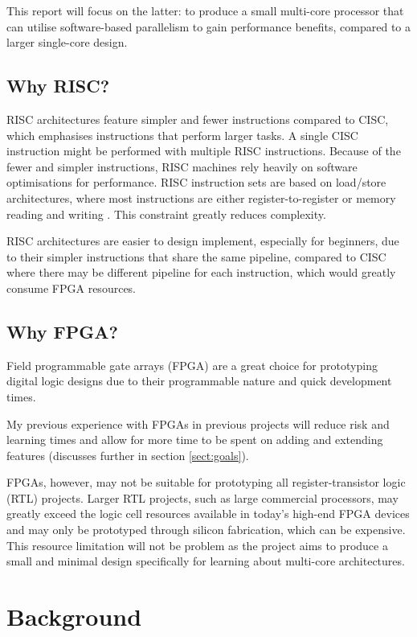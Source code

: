 \documentclass[11pt,a4paper]{report}
\begin{document}
{This report will focus on the latter: to produce a small multi-core processor that can utilise software-based parallelism to gain performance benefits, compared to a larger single-core design.

\section{Why RISC?}
RISC architectures feature simpler and fewer instructions compared to CISC, which emphasises instructions that perform larger tasks. A single CISC instruction might be performed with multiple RISC instructions. Because of the fewer and simpler instructions, RISC machines rely heavily on software optimisations for performance. 
RISC instruction sets are based on load/store architectures, where most instructions are either register-to-register or memory reading and writing \cite{flynn1995computer}. This constraint greatly reduces complexity.

RISC architectures are easier to design implement, especially for beginners, due to their simpler instructions that share the same pipeline, compared to CISC where there may be different pipeline for each instruction, which would greatly consume FPGA resources.

\section{Why FPGA?}
Field programmable gate arrays (FPGA) are a great choice for prototyping digital logic designs due to their programmable nature and quick development times. 

My previous experience with FPGAs in previous projects will reduce risk and learning times and allow for more time to be spent on adding and extending features (discusses further in section \ref{sect:goals}).

FPGAs, however, may not be suitable for prototyping all register-transistor logic (RTL) projects. Larger RTL projects, such as large commercial processors, may greatly exceed the logic cell resources available in today's high-end FPGA devices and may only be prototyped through silicon fabrication, which can be expensive. This resource limitation will not be problem as the project aims to produce a small and minimal design specifically for learning about multi-core architectures.

\chapter{Background}
{%
\startcontents[chapters]
}

}
\end{document}
